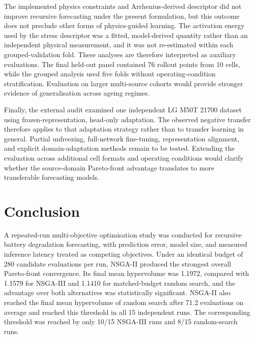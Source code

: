 \documentclass[a4paper,fleqn]{cas-sc}
\begin{document}
The implemented physics constraints and Arrhenius-derived descriptor did not
improve recursive forecasting under the present formulation, but this outcome
does not preclude other forms of physics-guided learning. The activation
energy used by the stress descriptor was a fitted, model-derived quantity
rather than an independent physical measurement, and it was not re-estimated
within each grouped-validation fold. These analyses are therefore interpreted
as auxiliary evaluations. The final held-out panel contained 76 rollout
points from 10 cells, while the grouped analysis used five folds without
operating-condition stratification. Evaluation on larger multi-source cohorts
would provide stronger evidence of generalisation across ageing regimes.

Finally, the external audit examined one independent LG M50T 21700 dataset
using frozen-representation, head-only adaptation. The observed negative
transfer therefore applies to that adaptation strategy rather than to
transfer learning in general. Partial unfreezing, full-network fine-tuning,
representation alignment, and explicit domain-adaptation methods remain to be
tested. Extending the evaluation across additional cell formats and operating
conditions would clarify whether the source-domain Pareto-front advantage
translates to more transferable forecasting models.

\section{Conclusion}
\label{sec:conclusion}

A repeated-run multi-objective optimisation study was conducted for recursive
battery degradation forecasting, with prediction error, model size, and
measured inference latency treated as competing objectives. Under an identical
budget of 280 candidate evaluations per run, NSGA-II produced the strongest
overall Pareto-front convergence. Its final mean hypervolume was 1.1972,
compared with 1.1579 for NSGA-III and 1.1410 for matched-budget random search,
and the advantage over both alternatives was statistically significant.
NSGA-II also reached the final mean hypervolume of random search after
71.2 evaluations on average and reached this threshold in all 15 independent
runs. The corresponding threshold was reached by only 10/15 NSGA-III runs and
8/15 random-search runs.
\end{document}
